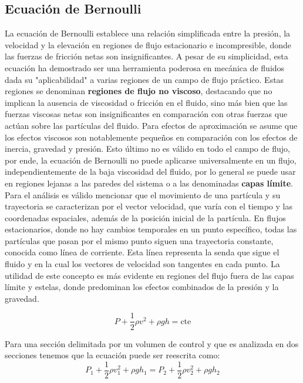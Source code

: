\documentclass[10pt, oneside]{article}
\begin{document}
\subsection{Ecuación de Bernoulli}
La ecuación de Bernoulli establece una relación simplificada entre la presión, la velocidad y la elevación en regiones de flujo estacionario e incompresible, donde las fuerzas de fricción netas son insignificantes. A pesar de su simplicidad, esta ecuación ha demostrado ser una herramienta poderosa en mecánica de fluidos dada su "aplicabilidad" a varias regiones de un campo de flujo práctico. Estas regiones se denominan  \textbf{regiones de flujo no viscoso}, destacando que no implican la ausencia de viscosidad o fricción en el fluido, sino más bien que las fuerzas viscosas netas son insignificantes en comparación con otras fuerzas que actúan sobre las partículas del fluido.
Para efectos de aproximación se asume que los efectos viscosos son notablemente pequeños en comparación con los efectos de inercia, gravedad y presión. Esto último no es válido en todo el campo de flujo, por ende, la ecuación de Bernoulli no puede aplicarse universalmente en un flujo, independientemente de la baja viscosidad del fluido, por lo general se puede usar en regiones lejanas a las paredes del sistema o a las denominadas \textbf{capas límite}.
Para el análisis es válido mencionar que el movimiento de una partícula y su trayectoria se caracterizan por el vector velocidad, que varía con el tiempo y las coordenadas espaciales, además de la posición inicial de la partícula. En flujos estacionarios, donde no hay cambios temporales en un punto específico, todas las partículas que pasan por el mismo punto siguen una trayectoria constante, conocida como línea de corriente. Esta línea representa la senda que sigue el fluido y en la cual los vectores de velocidad son tangentes en cada punto. La utilidad de este concepto es más evidente en regiones del flujo fuera de las capas límite y estelas, donde predominan los efectos combinados de la presión y la gravedad.

\begin{equation}
P + \frac{1}{2} \rho v^2 + \rho gh = \text{cte}
\end{equation}

Para una sección delimitada por un volumen de control y que es analizada en dos secciones tenemos que la ecuación puede ser reescrita como:
\begin{equation}
P_1 + \frac{1}{2} \rho v_1^2 + \rho g h_1 = P_2 + \frac{1}{2} \rho v_2^2 + \rho g h_2
\end{equation}
\end{document}
